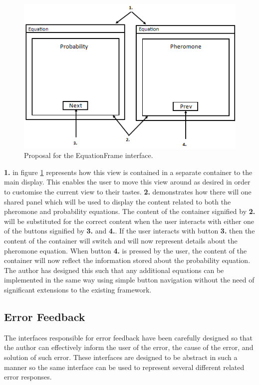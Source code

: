 \begin{figure}[H]
\centering
\includegraphics[scale=0.7]{Images/chapter4/pheroprobpanels}
\caption[EquationFrame Design]{Proposal for the EquationFrame interface.}
\label{fig:eqnViewImp}
\end{figure}

\textbf{1.} in figure \ref{fig:eqnViewImp} represents how this view is contained in a separate container to the main display. This enables the user to move this view around as desired in order to customise the current view to their tastes. \textbf{2.} demonstrates how there will one shared panel which will be used to display the content related to both the pheromone and probability equations. The content of the container signified by \textbf{2.} will be substituted for the correct content when the user interacts with either one of the buttons signified by \textbf{3.} and \textbf{4.}. If the user interacts with button \textbf{3.} then the content of the container will switch and will now represent details about the pheromone equation. When button \textbf{4.} is pressed by the user, the content of the container will now reflect the information stored about the probability equation. The author has designed this such that any additional equations can be implemented in the same way using simple button navigation without the need of significant extensions to the existing framework.

\subsection{Error Feedback}
The interfaces responsible for error feedback have been carefully designed so that the author can effectively inform the user of the error, the cause of the error, and solution of such error. These interfaces are designed to be abstract in such a manner so the same interface can be used to represent several different related error responses.

